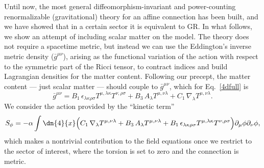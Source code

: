 \documentclass[aps,prl,twocolumn,superscriptaddress,showpacs,showkeys]{revtex4-1}
\begin{document}
Until now, the most general diffeomorphism-invariant and power-counting renormalizable (gravitational) theory for an affine connection has been built, and we have showed that in a certain sector it is equivalent to GR. In what follows, we show an attempt of including scalar matter on the model. The theory does not require a spacetime metric, but instead we can use the Eddington's inverse metric density ($\bar{g}^{\mu\nu}$), arising as the functional variation of the action with respect to the symmetric part of the Ricci tensor, to contract indices and build Lagrangian densities for the matter content. Following our precept, the matter content --- just scalar matter --- should couple to $\bar{g}^{\mu\nu}$, which for Eq.~\eqref{4dfull} is
\begin{dmath}
  \bar{g}^{\mu\nu} = B_1\, \epsilon_{\lambda\kappa\rho\sigma} T^{\mu, \lambda\kappa} T^{\nu, \rho\sigma} + B_3\, A_\lambda T^{\mu,\nu\lambda} + C_1\, \nabla_\lambda T^{\mu,\nu\lambda}.
\end{dmath}
We consider the action provided by the ``kinetic term''
\begin{dmath}
  \label{ScalarAction}
  S_\phi = - \alpha \int \dn{4}{x} \Big( C_1\, \nabla_\lambda T^{\mu,\nu\lambda}  + B_3\, A_\lambda T^{\mu,\nu\lambda} + B_1\, \epsilon_{\lambda\kappa\rho\sigma} T^{\mu, \lambda\kappa} T^{\nu, \rho\sigma} \Big) \partial_\mu\phi\partial_\nu\phi,
\end{dmath}
which makes a nontrivial contribution to the field equations once we restrict to the sector of interest, where the torsion is set to zero and the connection is metric.
\end{document}
